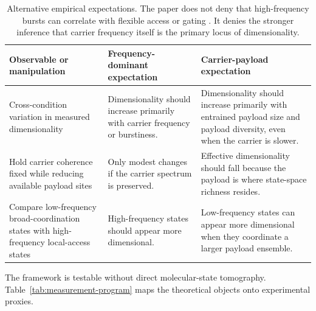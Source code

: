 \documentclass[11pt,a4paper]{article}
\theoremstyle{definition}
\theoremstyle{remark}
\begin{document}
\begin{table}[H]
\centering
\small
\begin{tabularx}{\linewidth}{@{}>{\raggedright\arraybackslash}p{3.2cm}YY@{}}
\toprule
Observable or manipulation & Frequency-dominant expectation & Carrier-payload expectation \\
\midrule
Cross-condition variation in measured dimensionality & Dimensionality should increase primarily with carrier frequency or burstiness. & Dimensionality should increase primarily with entrained payload size and payload diversity, even when the carrier is slower. \\
Hold carrier coherence fixed while reducing available payload sites & Only modest changes if the carrier spectrum is preserved. & Effective dimensionality should fall because the payload is where state-space richness resides. \\
Compare low-frequency broad-coordination states with high-frequency local-access states & High-frequency states should appear more dimensional. & Low-frequency states can appear more dimensional when they coordinate a larger payload ensemble. \\
\bottomrule
\end{tabularx}
\caption{Alternative empirical expectations. The paper does not deny that high-frequency bursts can correlate with flexible access or gating \cite{lundqvist2016gamma,miller2018working}. It denies the stronger inference that carrier frequency itself is the primary locus of dimensionality.}
\label{tab:rival-predictions}
\end{table}

The framework is testable without direct molecular-state tomography. Table~\ref{tab:measurement-program} maps the theoretical objects onto experimental proxies.
\end{document}

